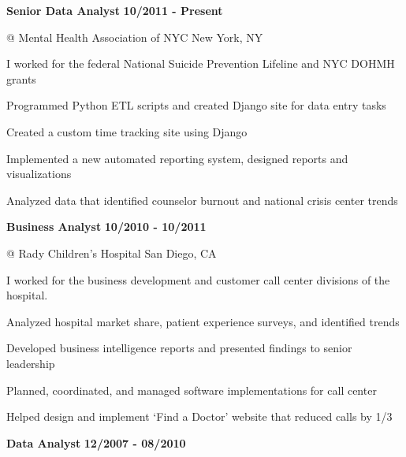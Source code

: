 \documentclass[11pt,letterpaper]{article}
\begin{document}

\large{\textbf{Senior Data Analyst}} \hfill \large{\textbf{10/2011 - Present}}

\normalsize{\textcolor{customgray}{@ Mental Health Association of NYC}} \hfill
\normalsize{\textcolor{customgray}{New York, NY}}

\normalsize{I worked for the federal National Suicide Prevention Lifeline and NYC DOHMH grants}
\smallskip
\begin{itemize*}  %
    \item Programmed Python ETL scripts and created Django site for data entry tasks
    \item Created a custom time tracking site using Django
    \item Implemented a new automated reporting system, designed reports and visualizations
    \item Analyzed data that identified counselor burnout and national crisis center trends
\end{itemize*}

\bigskip


\large{\textbf{Business Analyst}} \hfill \large{\textbf{10/2010 - 10/2011}}

\normalsize{\textcolor{customgray}{@ Rady Children's Hospital}} \hfill
\normalsize{\textcolor{customgray}{San Diego, CA}}

\normalsize{I worked for the business development and customer call center divisions of the hospital.}
\smallskip
\begin{itemize*}  %
    \item Analyzed hospital market share, patient experience surveys, and identified trends
    \item Developed business intelligence reports and presented findings to senior leadership
    \item Planned, coordinated, and managed software implementations for call center
    \item Helped design and implement ‘Find a Doctor’ website that reduced calls by 1/3
\end{itemize*}

\bigskip


\large{\textbf{Data Analyst}} \hfill \large{\textbf{12/2007 - 08/2010}}
\end{document}
